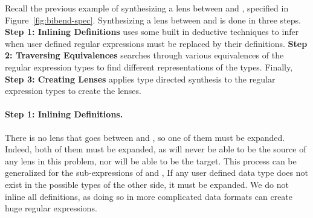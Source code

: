\documentclass[numbers,10pt,preprint\ifanon ,nocopyrightspace\fi]{sigplanconf}
\begin{document}
Recall the previous example of synthesizing a lens between  and
, specified in Figure~\ref{fig:bibend-spec}.  Synthesizing a lens
between  and  is done in three steps.
\textbf{Step 1:
  Inlining Definitions} uses some built in deductive techniques to infer when
user defined regular expressions must be replaced by their definitions.
\textbf{Step 2: Traversing Equivalences} searches through various equivalences
of the regular expression types to find different representations of the types.
Finally, \textbf{Step 3: Creating Lenses} applies type directed synthesis to the
regular expression types to create the lenses.

\paragraph*{Step 1:  Inlining Definitions.}

There is no lens that goes between  and , so one of them must
be expanded.
Indeed, both of them must be expanded, as  will never be able to be
the source of any lens in this problem, nor will  be able to be the
target.
This process can be generalized for the sub-expressions of  and ,  
If any user defined data type does not exist in the possible types of the
other side, it must be expanded.  We do
not inline all definitions, as doing so in more complicated data formats can
create huge regular expressions.
\end{document}
